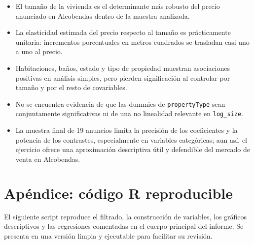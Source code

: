 \documentclass[11pt,a4paper]{article}
\begin{document}
\begin{itemize}
  \item El tamaño de la vivienda es el determinante más robusto del precio anunciado en Alcobendas dentro de la muestra analizada.
  \item La elasticidad estimada del precio respecto al tamaño es prácticamente unitaria: incrementos porcentuales en metros cuadrados se trasladan casi uno a uno al precio.
  \item Habitaciones, baños, estado y tipo de propiedad muestran asociaciones positivas en análisis simples, pero pierden significación al controlar por tamaño y por el resto de covariables.
  \item No se encuentra evidencia de que las dummies de \texttt{propertyType} sean conjuntamente significativas ni de una no linealidad relevante en \texttt{log\_size}.
  \item La muestra final de 19 anuncios limita la precisión de los coeficientes y la potencia de los contrastes, especialmente en variables categóricas; aun así, el ejercicio ofrece una aproximación descriptiva útil y defendible del mercado de venta en Alcobendas.
\end{itemize}

\clearpage
\appendix
\section*{Apéndice: código R reproducible}

El siguiente script reproduce el filtrado, la construcción de variables, los gráficos descriptivos y las regresiones comentadas en el cuerpo principal del informe. Se presenta en una versión limpia y ejecutable para facilitar su revisión.

\lstset{style=rstyle}

\end{document}
